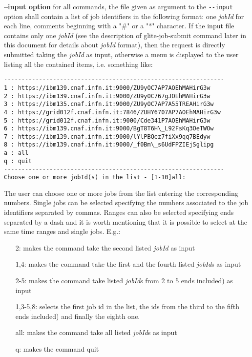 {\medskip
\textbf{--input option}
\medskip
\smallskip
for all commands, the file given as argument to the \verb!--input! option shall contain a list of job identifiers 
in the following format: one \textit{jobId} for each line, comments beginning with a "\#" or a "*" character.  
If the input file contains only one \textit{jobId} (see the description of glite-job-submit command later in this 
document for details about \textit{jobId} format), then the request is directly submitted taking the 
\textit{jobId} as input, otherwise a menu is displayed to the user listing all the contained items, 
i.e. something like:

\smallskip
\begin{scriptsize}
\begin{verbatim}
---------------------------------------------------------------
1 : https://ibm139.cnaf.infn.it:9000/ZU9yOC7AP7AOEhMAHirG3w
2 : https://ibm139.cnaf.infn.it:9000/ZU9yOC767gJOEhMAHirG3w
3 : https://ibm135.cnaf.infn.it:9000/ZU9yOC7AP7A55TREAHirG3w
4 : https://grid012f.cnaf.infn.it:7846/ZUHY6707AP7AOEhMAHirG3w
5 : https://grid012f.cnaf.infn.it:9000/Cde341P7AOEhMAHirG3w
6 : https://ibm139.cnaf.infn.it:9000/BgT8T6H\_L92FsKq3OeTWOw
7 : https://ibm139.cnaf.infn.it:9000/lYlPBQez7fiXx9qq7BEdyw
8 : https://ibm139.cnaf.infn.it:9000/_f0Bm\_s6UdFPZIEjSglipg
a : all
q : quit
---------------------------------------------------------------
Choose one or more jobId(s) in the list - [1-10]all:
\end{verbatim} 
\end{scriptsize}
\smallskip

The user can choose one or more jobs from the list entering the corresponding numbers. Single jobs can be selected 
specifying the numbers associated to the job identifiers separated by commas. Ranges can also be selected 
specifying ends separated by a dash and it is worth mentioning that it is possible to select at the same time 
ranges and single jobs. E.g.:

\begin{itemize}
\item [2:] 	makes the command take the second listed \textit{jobId} as input
\item [1,4:]	makes the command take the first and the fourth listed \textit{jobId}s as input
\item [2-5:]	makes the command take listed \textit{jobId}s from 2 to 5 ends included) as input
\item [1,3-5,8:] selects the first job id in the list, the ids from the third to the fifth ends included) 
and finally the eighth one.
\item [all:]	makes the command take all listed \textit{jobId}s as input
\item [q:]	makes the command quit
\end{itemize}

}
